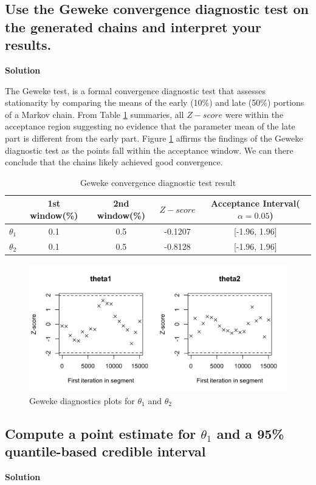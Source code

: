 \documentclass[12pt]{article}
\begin{document}
\subsection{Use the Geweke convergence diagnostic test on the generated chains and interpret your results.}
\textbf{Solution}

The Geweke test, is a formal convergence diagnostic test that assesses stationarity by comparing the means of the early (10\%) and late (50\%) portions of a Markov chain. From Table \ref{tab:geweke_gs} summaries, all $Z-score$ were within the acceptance region suggesting no evidence that the parameter mean of the late part is different from the early part. Figure \ref{fig:gs-geweke}   affirms the findings of the Geweke diagnostic test as the points fall within the acceptance window. We can there conclude that the chains likely achieved good convergence.
\begin{table}[h!]
\centering
\caption{Geweke convergence diagnostic test result}
\begin{tabular}{lcccc}
\toprule
\textbf{} & \textbf{1st window(\%)} & \textbf{2nd window(\%)} & \textbf{$Z-score$} & \textbf{Acceptance Interval($\alpha = 0.05$)}  \\
\midrule
$\theta_1$ & 0.1& 0.5 & -0.1207  & [-1.96, 1.96] \\
$\theta_2$ & 0.1& 0.5 & -0.8128 & [-1.96, 1.96] \\
\bottomrule
\end{tabular}
\label{tab:geweke_gs}
\end{table}

\begin{figure}[h!]
    \centering
    \includegraphics[width=0.6\linewidth]{pictures/fig05-gs-geweke.png}
    \caption{Geweke diagnostics plots for  $\theta_1$ and $\theta_2$ }
    \label{fig:gs-geweke}
\end{figure}


\subsection{Compute a point estimate for $\theta_1$ and a 95\% quantile-based credible interval}
\textbf{Solution}
\end{document}
